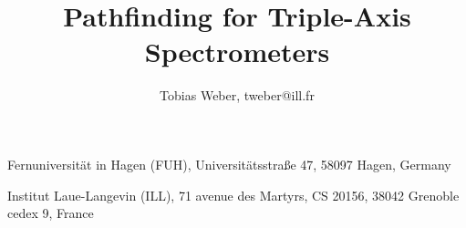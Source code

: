\documentclass[english, 11pt, a4paper]{book}
\newcommand{\ill}{\par{Institut Laue-Langevin (ILL), 71 avenue des Martyrs, CS 20156, 38042 Grenoble cedex 9, France\par}}
\newcommand{\fuh}{\par{Fernuniversit\"at in Hagen (FUH), Universit\"atsstraße 47, 58097 Hagen, Germany\par}}
\begin{document}
%

\title{Pathfinding for Triple-Axis Spectrometers}
\author{Tobias Weber, tweber@ill.fr}
\maketitle

\vspace*{\fill}
\fuh
\ill

\tableofcontents




















\appendix




%



\listoffigures{}
\listoftables{}
\cleardoublepage
{}

\end{document}
